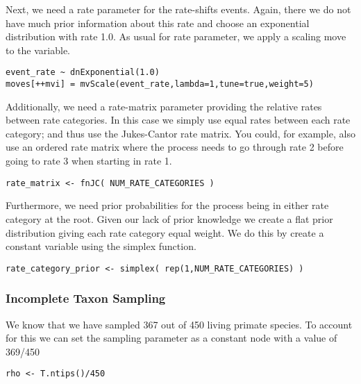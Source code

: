 Next, we need a rate parameter for the rate-shifts events.
Again, there we do not have much prior information about this rate and choose an exponential distribution with rate 1.0.
As usual for rate parameter, we apply a scaling move to the  variable.
{\tt \begin{snugshade*}
\begin{lstlisting}
event_rate ~ dnExponential(1.0)
moves[++mvi] = mvScale(event_rate,lambda=1,tune=true,weight=5)
\end{lstlisting}
\end{snugshade*}}

Additionally, we need a rate-matrix parameter providing the relative rates between rate categories.
In this case we simply use equal rates between each rate category; and thus use the Jukes-Cantor rate matrix.
You could, for example, also use an ordered rate matrix where the process needs to go through rate 2 before going to rate 3 when starting in rate 1.
{\tt \begin{snugshade*}
\begin{lstlisting}
rate_matrix <- fnJC( NUM_RATE_CATEGORIES )
\end{lstlisting}
\end{snugshade*}}
Furthermore, we need prior probabilities for the process being in either rate category at the root.
Given our lack of prior knowledge we create a flat prior distribution giving each rate category equal weight.
We do this by create a constant variable using the simplex function.
{\tt \begin{snugshade*}
\begin{lstlisting}
rate_category_prior <- simplex( rep(1,NUM_RATE_CATEGORIES) )
\end{lstlisting}
\end{snugshade*}}



\subsubsection{Incomplete Taxon Sampling}

We know that we have sampled 367 out of 450 living primate species. 
To account for this we can set the sampling parameter as a constant node with a value of 369/450
{\tt \begin{snugshade*}
\begin{lstlisting}
rho <- T.ntips()/450
\end{lstlisting}
\end{snugshade*}}


